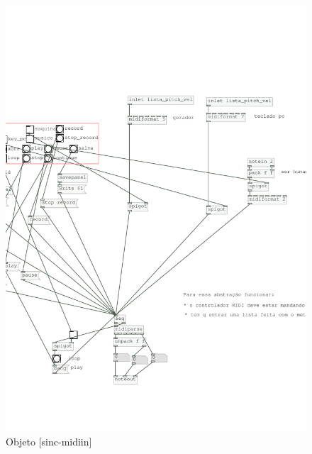 \documentclass[draft]{ppgmus}
\begin{document}
% 

\begin{figure}
\includegraphics[scale=.5]{sinc-midiin}
\caption{Objeto [sinc-midiin]}
\label{sinc-midiin}
\end{figure}
\end{document}
